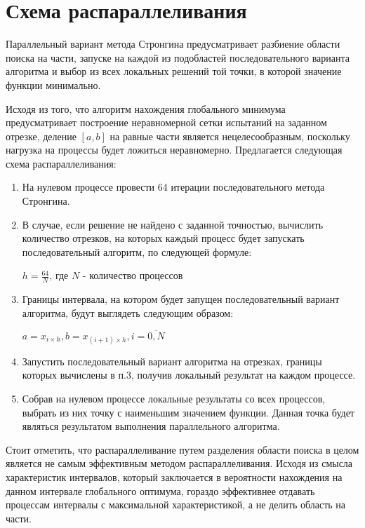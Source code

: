 \documentclass{report}
\begin{document}
	\section*{Схема распараллеливания}
	Параллельный вариант метода Стронгина предусматривает разбиение области поиска на части, запуске на каждой из подобластей последовательного варианта алгоритма и выбор из всех локальных решений той точки, в которой значение функции минимально.
	\par Исходя из того, что алгоритм нахождения глобального минимума предусматривает построение неравномерной сетки испытаний на заданном отрезке, деление $[a,b]$ на равные части является нецелесообразным, поскольку нагрузка на процессы будет ложиться неравномерно. Предлагается следующая схема распараллеливания:\par
	\begin{enumerate}
		\item На нулевом процессе провести 64 итерации последовательного метода Стронгина.
		\item В случае, если решение не найдено с заданной точностью, вычислить количество отрезков, на которых каждый процесс будет запускать последовательный алгоритм, по следующей формуле:\par
		$h = \frac{64}{N}$, где $N$ - количество процессов
		\item Границы интервала, на котором будет запущен последовательный вариант алгоритма, будут выглядеть следующим образом:\par
		$a = x_{i\times{}h}, b = x_{(i+1)\times{}h}, i = \overline{0,N} $
		\item Запустить последовательный вариант алгоритма на отрезках, границы которых вычислены в п.3, получив локальный результат на каждом процессе.
		\item Собрав на нулевом процессе локальные результаты со всех процессов, выбрать из них точку с наименьшим значением функции. Данная точка будет являться результатом выполнения параллельного алгоритма.
	\end{enumerate}
	\par Стоит отметить, что распараллеливание путем разделения области поиска в целом является не самым эффективным методом распараллеливания. Исходя из смысла характеристик интервалов, который заключается в вероятности нахождения на данном интервале глобального оптимума, гораздо эффективнее отдавать процессам интервалы с максимальной характеристикой, а не делить область на части.
	\newpage
	
\end{document}
